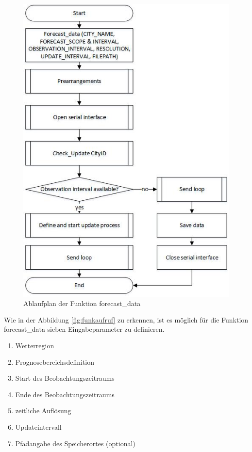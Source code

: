 \begin{figure}
\centering
\includegraphics[scale=1]{programm/flowchart}
\caption{Ablaufplan der Funktion forecast\_data}
\label{fig:flowchart}
\end{figure} 
Wie in der Abbildung \ref{fig:funkaufruf} zu erkennen, ist es möglich für die Funktion \textsf{forecast\_data} sieben Eingabeparameter zu definieren. 
\begin{enumerate}
\item Wetterregion
\item Prognosebereichsdefinition
\item Start des Beobachtungszeitraums
\item Ende des Beobachtungszeitraums
\item zeitliche Auflösung
\item Updateintervall
\item Pfadangabe des Speicherortes (optional)
\end{enumerate}
